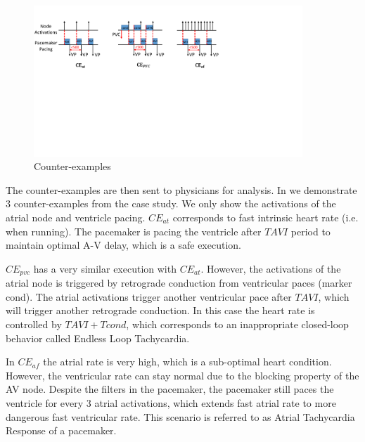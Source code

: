 \begin{figure}[!t]
		\centering
		\includegraphics[width=0.9\textwidth]{figs/case.pdf}
		\caption{\small Counter-examples}
		\label{fig:CE}
\end{figure}

The counter-examples are then sent to physicians for analysis. In  we demonstrate 3 counter-examples from the case study. We only show the activations of the atrial node and ventricle pacing. 
$CE_{at}$ corresponds to fast intrinsic heart rate (i.e. when running). The pacemaker is pacing the ventricle after $TAVI$ period to maintain optimal A-V delay, which is a safe execution. 

$CE_{pvc}$ has a very similar execution with $CE_{at}$. However, the activations of the atrial node is triggered by retrograde conduction from ventricular paces (marker \textsf{cond}). The atrial activations trigger another ventricular pace after $TAVI$, which will trigger another retrograde conduction. In this case the heart rate is controlled by $TAVI+Tcond$, which corresponds to an inappropriate closed-loop behavior called Endless Loop Tachycardia.

In $CE_{af}$ the atrial rate is very high, which is a sub-optimal heart condition. However, the ventricular rate can stay normal due to the blocking property of the AV node. Despite the filters in the pacemaker, the pacemaker still paces the ventricle for every 3 atrial activations, which extends fast atrial rate to more dangerous fast ventricular rate. This scenario is referred to as Atrial Tachycardia Response of a pacemaker. 

